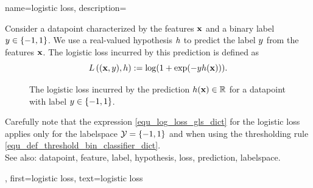 {name={logistic loss}, 
	description={Consider 
		a \gls{datapoint} characterized by the \glspl{feature} ${\bf x}$ and a binary \gls{label} $y \in \{-1,1\}$. 
		We use a real-valued \gls{hypothesis} $h$ to predict the \gls{label} $y$ 
		from the \glspl{feature} ${\bf x}$. The logistic \gls{loss} incurred by this \gls{prediction} is 
		defined as 
	\begin{equation} 
		\label{equ_log_loss_gls_dict}
		L\left(({\bf x},y),h \right) :=  \log ( 1 + \exp(- y h({\bf x}))).
	\end{equation}
	\begin{figure}[H]
	\begin{center}
		\caption{The logistic \gls{loss} incurred by the \gls{prediction} $h({\bf x}) \in \mathbb{R}$ 
			for a \gls{datapoint} with \gls{label} $y \in \{-1,1\}$.}
		\label{fig_logloss_dict}
	\end{center}
	\end{figure}
	Carefully note that the expression \eqref{equ_log_loss_gls_dict} 
	for the logistic \gls{loss} applies only for the \gls{labelspace} $\mathcal{Y} = \{ -1,1\}$ and when using 
	the thresholding rule \eqref{equ_def_threshold_bin_classifier_dict}. 
		\\
		See also: \gls{datapoint}, \gls{feature}, \gls{label}, \gls{hypothesis}, \gls{loss}, \gls{prediction}, \gls{labelspace}.},
	first={logistic loss},
	text={logistic loss}
}
	
